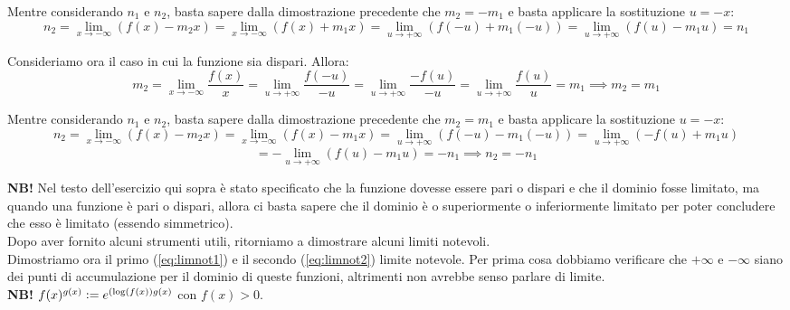 \documentclass{article}
\begin{document}
\noindent Mentre considerando $n_1$ e $n_2$, basta sapere dalla dimostrazione precedente che $m_2 = -m_1$ e basta applicare la sostituzione $u = -x$:
\begin{equation*}
    n_2 = \lim_{x \to -\infty} (f(x) - m_2x) = \lim_{x \to -\infty} (f(x) + m_1x) = \lim_{u \to +\infty} (f(-u) + m_1(-u)) = \lim_{u \to +\infty} (f(u) - m_1u) = n_1
\end{equation*}

\noindent Consideriamo ora il caso in cui la funzione sia dispari. Allora:
\begin{equation*}
    m_2 = \lim_{x \to -\infty} \frac{f(x)}{x} = \lim_{u \to +\infty} \frac{f(-u)}{-u} = \lim_{u \to +\infty} \frac{-f(u)}{-u} = \lim_{u \to +\infty} \frac{f(u)}{u} = m_1 \implies m_2 = m_1
\end{equation*}

\noindent Mentre considerando $n_1$ e $n_2$, basta sapere dalla dimostrazione precedente che $m_2 = m_1$ e basta applicare la sostituzione $u = -x$:
\begin{equation*}
    n_2 = \lim_{x \to -\infty} (f(x) - m_2x) = \lim_{x \to -\infty} (f(x) - m_1x) = \lim_{u \to +\infty} (f(-u) - m_1(-u)) = \lim_{u \to +\infty} (-f(u) + m_1u)
\end{equation*}
\begin{equation*}
    = - \lim_{u \to +\infty} (f(u) - m_1u) = -n_1 \implies n_2 = -n_1
\end{equation*}

\noindent\textbf{NB!} Nel testo dell'esercizio qui sopra è stato specificato che la funzione dovesse essere pari o dispari e che il dominio fosse limitato, ma quando una funzione è pari o dispari, allora ci basta sapere che il dominio è o superiormente o inferiormente limitato per poter concludere che esso è limitato (essendo simmetrico).\\

\noindent Dopo aver fornito alcuni strumenti utili, ritorniamo a dimostrare alcuni limiti notevoli.\\
Dimostriamo ora il primo (\ref{eq:limnot1}) e il secondo (\ref{eq:limnot2}) limite notevole. Per prima cosa dobbiamo verificare che $+\infty$ e $-\infty$ siano dei punti di accumulazione per il dominio di queste funzioni, altrimenti non avrebbe senso parlare di limite.\\

\noindent\textbf{NB!} $f(x)^{g(x)} \vcentcolon= e^{(\log(f(x))g(x)}$ con $f(x) > 0$.\\
\end{document}
